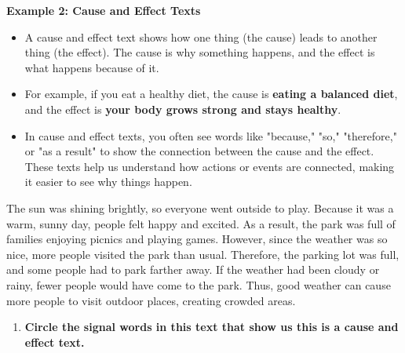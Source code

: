 \documentclass[12pt]{article}
\begin{document}
\begin{tcolorbox}[colframe=black!60, colback=white, 
coltitle=black, colbacktitle=black!15, fonttitle=\bfseries\Large, 
title=Examples, halign title=center, left=10pt, right=10pt, top=10pt, bottom=15pt]

\textbf{Example 2: Cause and Effect Texts}
\begin{itemize}

    \item A cause and effect text shows how one thing (the cause) leads to another thing (the effect). The cause is why something happens, and the effect is what happens because of it.
    \item For example, if you eat a healthy diet, the cause is \textbf{eating a balanced diet}, and the effect is \textbf{your body grows strong and stays healthy}.
    \item In cause and effect texts, you often see words like "because," "so," "therefore," or "as a result" to show the connection between the cause and the effect. These texts help us understand how actions or events are connected, making it easier to see why things happen.

 
        \end{itemize}
        
    

\end{tcolorbox}
\vspace {0.5cm}
\begin{tcolorbox}[colframe=black!60, colback=white, 
coltitle=black, colbacktitle=black!15, fonttitle=\bfseries\Large, 
title=Guided Practice, halign title=center, left=10pt, right=10pt, top=10pt, bottom=15pt]


The sun was shining brightly, so everyone went outside to play. Because it was a warm, sunny day, people felt happy and excited. As a result, the park was full of families enjoying picnics and playing games. However, since the weather was so nice, more people visited the park than usual. Therefore, the parking lot was full, and some people had to park farther away. If the weather had been cloudy or rainy, fewer people would have come to the park. Thus, good weather can cause more people to visit outdoor places, creating crowded areas.

 

\begin{enumerate}[itemsep=3em]
    \item \textbf{Circle the signal words in this text that show us this is a \textbf{cause and effect } text.}
\end{enumerate}
\end{tcolorbox}
\end{document}
